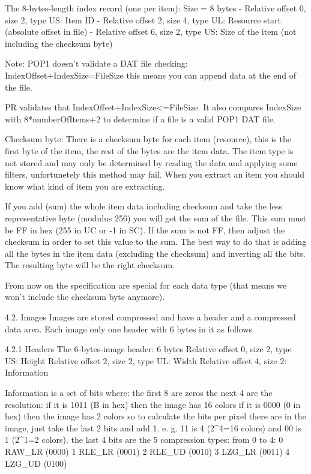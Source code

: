  The 8-bytes-length index record (one per item): Size = 8 bytes
  - Relative offset 0, size 2, type US: Item ID
  - Relative offset 2, size 4, type UL: Resource start
           (absolute offset in file)
  - Relative offset 6, size 2, type US: Size of the item
           (not including the checksum byte)

 Note:
  POP1 doesn't validate a DAT file checking:
	 IndexOffset+IndexSize=FileSize
  this means you can append data at the end of the file.

  PR validates that IndexOffset+IndexSize<=FileSize.
	It also compares IndexSize with 8*numberOfItems+2 to determine if a file
  is a valid POP1 DAT file.

 Checksum byte:
 There is a checksum byte for each item (resource), this is the first byte
 of the item, the rest of the bytes are the item data. The item type is not
 stored and may only be determined by reading the data and applying some
 filters, unfortunetely this method may fail. When you extract an item you
 should know what kind of item you are extracting.

 If you add (sum) the whole item data including checksum and take the less
 representative byte (modulus 256) you will get the sum of the file. This
 sum must be FF in hex (255 in UC or -1 in SC). If the sum is not FF, then
 adjust the checksum in order to set this value to the sum. The best way
 to do that is adding all the bytes in the item data (excluding the
 checksum) and inverting all the bits. The resulting byte will be the
 right checksum.

 From now on the specification are special for each data type (that means
 we won't include the checksum byte anymore).

4.2. Images
 Images are stored compressed and have a header and a compressed data area.
 Each image only one header with 6 bytes in it as follows

4.2.1 Headers
 The 6-bytes-image header: 6 bytes
  Relative offset 0, size 2, type US: Height
  Relative offset 2, size 2, type UL: Width
  Relative offset 4, size 2: Information

 Information is a set of bits where:
  the first 8 are zeros
  the next 4 are the resolution:
   if it is 1011 (B in hex) then the image has 16 colors
   if it is 0000 (0 in hex) then the image has 2 colors
   so to calculate the bits per pixel there are in the image, just take the
   last 2 bits and add 1. e. g. 11 is 4 (2^4=16 colors) and
	 00 is 1 (2^1=2 colors).
  the last 4 bits are the 5 compression types:
   from 0 to 4:
   0 RAW_LR (0000)
   1 RLE_LR (0001)
   2 RLE_UD (0010)
   3 LZG_LR (0011)
   4 LZG_UD (0100)

